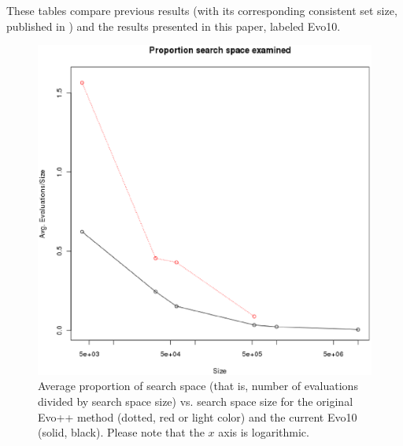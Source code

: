 \documentclass[conference]{IEEEtran}
\begin{document}
These tables compare previous results (with its corresponding
consistent set size, published in \cite{DBLP:conf/cec/GuervosMC11}) and the results presented in this paper, labeled
Evo10.
\begin{figure}[!htb]
\centering
\includegraphics[scale=0.50]{proportion.eps}
\caption{Average proportion of search space (that is, number of evaluations divided by search space size)
  vs. search space size for the original Evo++ method (dotted, red or light
  color) and the current Evo10 (solid, black). Please note
  that the $x$ axis is logarithmic.   \label{fig:prop}}
\end{figure} 
%
\end{document}
